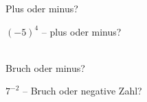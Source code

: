 \setcounter{aufgabe}{11}

\begin{aufgabe}{Plus oder minus?}
\begin{teile}
\teil $(-5)^4$ – plus oder minus?\\  \\ 
\end{teile}
\end{aufgabe}

\begin{aufgabe}{Bruch oder minus?}
\begin{teile}
\teil $7^{-2}$ – Bruch oder negative Zahl?\\  \\ 
\end{teile}
\end{aufgabe}

